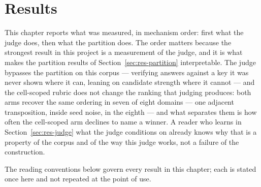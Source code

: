 \chapter{Results}\label{ch:results}

This chapter reports what was measured, in mechanism order: first what
the judge does, then what the partition does. The order matters
because the strongest result in this project is a measurement of the
judge, and it is what makes the partition results of
Section~\ref{sec:res-partition} interpretable. The judge bypasses the
partition on this corpus --- verifying answers against a key it was
never shown where it can, leaning on candidate strength where it
cannot --- and the cell-scoped rubric does not change the ranking
that judging produces: both arms recover the same ordering in seven
of eight domains --- one adjacent transposition, inside seed noise,
in the eighth --- and what separates them is how often the
cell-scoped arm declines to name a winner. A reader who learns in
Section~\ref{sec:res-judge} what the judge conditions on already knows
why that is a property of the corpus and of the way this judge works,
not a failure of the construction.

The reading conventions below govern every result in this chapter;
each is stated once here and not repeated at the point of use.

